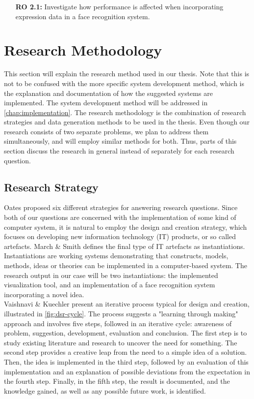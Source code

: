 \begin{enumerate}[align=left, labelwidth=3.5em, leftmargin=!, itemindent=0em]
    \item[\textbf{RO 2.1:}]Investigate how performance is affected when incorporating expression data in a face recognition system.
\end{enumerate}

\section{Research Methodology}

This section will explain the research method used in our thesis. Note that this is not to be confused with the more specific system development method, which is the explanation and documentation of how the suggested systems are implemented. The system development method will be addressed in \autoref{chap:implementation}. The research methodology is the combination of research strategies and data generation methods to be used in the thesis. Even though our research consists of two separate problems, we plan to address them simultaneously, and will employ similar methods for both. Thus, parts of this section discuss the research in general instead of separately for each research question.

\subsection{Research Strategy}

Oates \cite{oates} proposed six different strategies for answering research questions. Since both of our questions are concerned with the implementation of some kind of computer system, it is natural to employ the design and creation strategy, which focuses on developing new information technology (IT) products, or so called artefacts. March \& Smith \cite{march-smith} defines the final type of IT artefacts as instantiations. Instantiations are working systems demonstrating that constructs, models, methods, ideas or theories can be implemented in a computer-based system. The research output in our case will be two instantiations: the implemented visualization tool, and an implementation of a face recognition system incorporating a novel idea. \\

\noindent Vaishnavi \& Kuechler \cite{designscience} present an iterative process typical for design and creation, illustrated in \autoref{fig:dsr-cycle}. The process suggests a "learning through making" approach and involves five steps, followed in an iterative cycle: awareness of problem, suggestion, development, evaluation and conclusion. The first step is to study existing literature and research to uncover the need for something. The second step provides a creative leap from the need to a simple idea of a solution. Then, the idea is implemented in the third step, followed by an evaluation of this implementation and an explanation of possible deviations from the expectation in the fourth step. Finally, in the fifth step, the result is documented, and the knowledge gained, as well as any possible future work, is identified. \\

